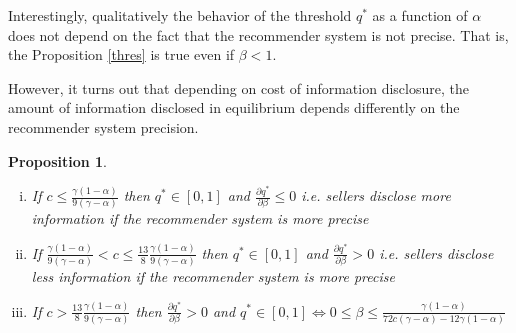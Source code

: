 \documentclass[a4paper]{article}
\newtheorem{proposition}[theorem]{Proposition}
\begin{document}
Interestingly, qualitatively the behavior of the threshold $q^*$ as a function of $\alpha$ does not depend on the fact that the recommender system is not precise. That is, the Proposition \ref{thres} is true even if $\beta < 1$.


However, it turns out that depending on cost of information disclosure, the amount of information disclosed in equilibrium depends differently on the recommender system precision.



\begin{proposition}\label{thres_beta}
	\begin{enumerate}[(i)]
		\item If $c \le \frac{\gamma(1-\alpha)}{9(\gamma - \alpha)}$ then $q^* \in [0, 1]$ and $\frac{\partial q^*}{\partial \beta} \le 0$ i.e. sellers disclose more information if the recommender system is more precise
		\item If $\frac{\gamma(1-\alpha)}{9(\gamma - \alpha)} < c \le \frac{13}{8}\frac{\gamma(1-\alpha)}{9(\gamma - \alpha)}$ then $q^* \in [0, 1]$ and $\frac{\partial q^*}{\partial \beta} > 0$ i.e. sellers disclose less information if the recommender system is more precise
		\item If $c > \frac{13}{8}\frac{\gamma(1-\alpha)}{9(\gamma - \alpha)}$ then $\frac{\partial q^*}{\partial \beta} > 0$ and $q^* \in [0, 1] \iff 0 \le \beta \le \frac{\gamma(1-\alpha)}{72 c (\gamma - \alpha) - 12 \gamma (1-\alpha)}$ 
	\end{enumerate}
\end{proposition}
\end{document}
